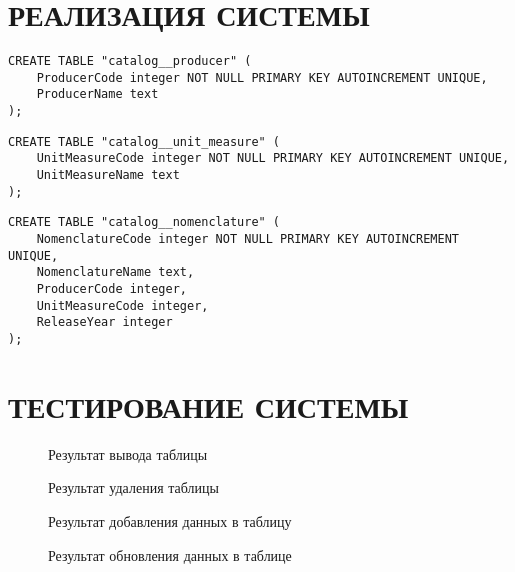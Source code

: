 \documentclass[
    12pt, %
    a4paper, %
    simple, %
    floatsection %
]{eskdtext}
\begin{document}
\newpage
\section{РЕАЛИЗАЦИЯ СИСТЕМЫ}

\begin{lstlisting}[name=Справочник "Производители"]
CREATE TABLE "catalog__producer" (
    ProducerCode integer NOT NULL PRIMARY KEY AUTOINCREMENT UNIQUE,
    ProducerName text
);
\end{lstlisting}

\begin{lstlisting}[name=Справочник "Единицы хранения"]
CREATE TABLE "catalog__unit_measure" (
    UnitMeasureCode integer NOT NULL PRIMARY KEY AUTOINCREMENT UNIQUE,
    UnitMeasureName text
);
\end{lstlisting}

\begin{lstlisting}[name=Справочник "Номенклатура"]
CREATE TABLE "catalog__nomenclature" (
    NomenclatureCode integer NOT NULL PRIMARY KEY AUTOINCREMENT UNIQUE,
    NomenclatureName text,
    ProducerCode integer,
    UnitMeasureCode integer,
    ReleaseYear integer
);
\end{lstlisting}

\newpage
\section{ТЕСТИРОВАНИЕ СИСТЕМЫ}

\begin{figure}[!h]
    \centering
    \caption{Результат вывода таблицы}
\end{figure}

\begin{figure}[!h]
    \centering
    \caption{Результат удаления таблицы}
\end{figure}

\begin{figure}[!h]
    \centering
    \caption{Результат добавления данных в таблицу}
\end{figure}

\begin{figure}[!h]
    \centering
    \caption{Результат обновления данных в таблице}
\end{figure}
\end{document}
